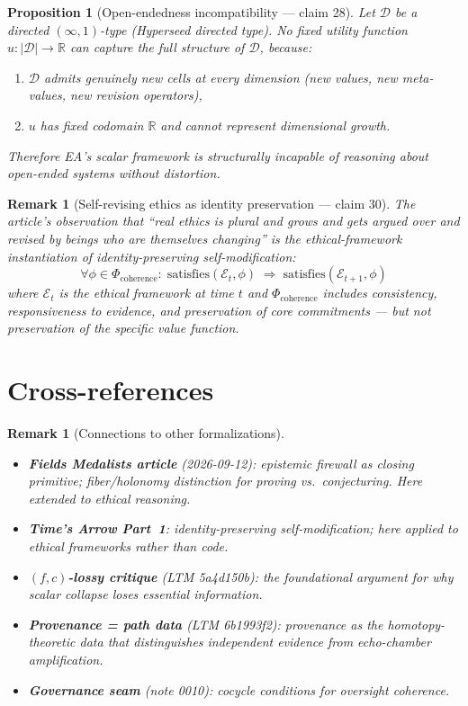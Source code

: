 \documentclass[11pt,a4paper]{article}
\newtheorem{proposition}[definition]{Proposition}
\newtheorem{remark}[definition]{Remark}
\begin{document}
\begin{proposition}[Open-endedness incompatibility --- claim 28]
\label{prop:open-ended}
Let $\mathcal{D}$ be a directed $(\infty,1)$-type (Hyperseed directed
type). No fixed utility function $u : |\mathcal{D}| \to \mathbb{R}$
can capture the full structure of $\mathcal{D}$, because:
\begin{enumerate}
\item $\mathcal{D}$ admits genuinely new cells at every dimension
  (new values, new meta-values, new revision operators),
\item $u$ has fixed codomain $\mathbb{R}$ and cannot represent
  dimensional growth.
\end{enumerate}
Therefore EA's scalar framework is structurally incapable of reasoning
about open-ended systems without distortion.
\end{proposition}

\begin{remark}[Self-revising ethics as identity preservation --- claim 30]
The article's observation that ``real ethics is plural and grows and gets
argued over and revised by beings who are themselves changing'' is the
ethical-framework instantiation of identity-preserving self-modification:
\[
  \forall \phi \in \Phi_{\text{coherence}}: \;
  \text{satisfies}(\mathcal{E}_t, \phi) \;\Longrightarrow\;
  \text{satisfies}(\mathcal{E}_{t+1}, \phi)
\]
where $\mathcal{E}_t$ is the ethical framework at time $t$ and
$\Phi_{\text{coherence}}$ includes consistency, responsiveness to
evidence, and preservation of core commitments --- but \emph{not}
preservation of the specific value function.
\end{remark}

\section{Cross-references}

\begin{remark}[Connections to other formalizations]
\begin{itemize}
\item \textbf{Fields Medalists article} (2026-09-12): epistemic firewall
  as closing primitive; fiber/holonomy distinction for proving vs.\
  conjecturing. Here extended to ethical reasoning.
\item \textbf{Time's Arrow Part~1}: identity-preserving self-modification;
  here applied to ethical frameworks rather than code.
\item \textbf{$(f,c)$-lossy critique} (LTM 5a4d150b): the foundational
  argument for why scalar collapse loses essential information.
\item \textbf{Provenance = path data} (LTM 6b1993f2): provenance as
  the homotopy-theoretic data that distinguishes independent evidence
  from echo-chamber amplification.
\item \textbf{Governance seam} (note 0010): cocycle conditions for
  oversight coherence.
\end{itemize}
\end{remark}
\end{document}
